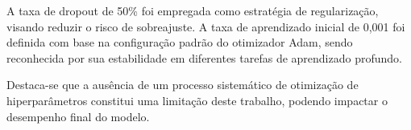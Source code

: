 A taxa de dropout de 50\% foi empregada como estratégia de regularização, visando reduzir o risco de sobreajuste. A taxa de aprendizado inicial de 
0,001 foi definida com base na configuração padrão do otimizador Adam, sendo reconhecida por sua estabilidade em diferentes tarefas de aprendizado 
profundo.

Destaca-se que a ausência de um processo sistemático de otimização de hiperparâmetros constitui uma limitação deste trabalho, podendo impactar o 
desempenho final do modelo.